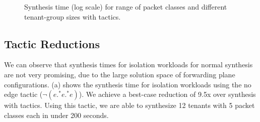 \begin{figure}
		\centering
	\caption{\label{fig:tactic-isolation}
				Synthesis time (log scale) for range of packet classes and different tenant-group sizes with tactics.}
\end{figure}
		

\subsection{Tactic Reductions}
We can observe that synthesis times for isolation workloads for normal synthesis are not 
very promising, due to the large solution space of forwarding plane configurations.
(a) shows the synthesis time for isolation workloads using the no edge tactic 
($\neg(e .^* e .^* e)$). We achieve a best-case reduction of 9.5x over synthesis with tactics. 
Using this tactic, we are able to synthesize 12 tenants with 5 packet classes each in under 200
seconds.

